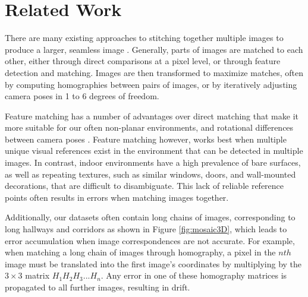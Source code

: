 \documentclass[]{spie}  %
\begin{document}
\section{Related Work}
\label{sec:relatedWork}
There are many existing approaches to stitching together multiple
images to produce a larger, seamless image \cite{szeliski2006image,
  agarwalapanoramas, wangmultipleviews, coorg1997matching,
  debevechybrid, bernardinimultiplescans}. Generally, parts of images
are matched to each other, either through direct comparisons at a
pixel level, or through feature detection and matching. Images are
then transformed to maximize matches, often by computing homographies
between pairs of images, or by iteratively adjusting camera poses in 1
to 6 degrees of freedom.

Feature matching has a number of advantages over direct matching that
make it more suitable for our often non-planar environments, and
rotational differences between camera poses
\cite{szeliski2006image}. Feature matching however, works best when
multiple unique visual references exist in the environment that can be
detected in multiple images. In contrast, indoor environments have a
high prevalence of bare surfaces, as well as repeating textures, such
as similar windows, doors, and wall-mounted decorations, that are
difficult to disambiguate. This lack of reliable reference points
often results in errors when matching images together.

Additionally, our datasets often contain long chains of images,
corresponding to long hallways and corridors as shown in Figure
\ref{fig:mosaic3D}, which leads to error accumulation when image
correspondences are not accurate. For example, when matching a long
chain of images through homography, a pixel in the $nth$ image must be
translated into the first image's coordinates by multiplying by the
$3\times3$ matrix $H_1 H_2 H_3 ... H_n$. Any error in one of these
homography matrices is propagated to all further images, resulting in
drift.
\end{document}
